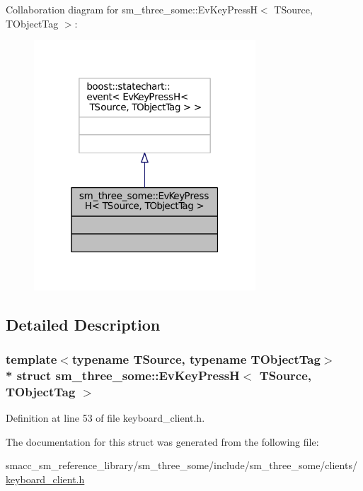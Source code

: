 Collaboration diagram for sm\+\_\+three\+\_\+some\+:\+:Ev\+Key\+PressH$<$ T\+Source, T\+Object\+Tag $>$\+:
\nopagebreak
\begin{figure}[H]
\begin{center}
\leavevmode
\includegraphics[width=235pt]{structsm__three__some_1_1EvKeyPressH__coll__graph}
\end{center}
\end{figure}


\subsection{Detailed Description}
\subsubsection*{template$<$typename T\+Source, typename T\+Object\+Tag$>$\\*
struct sm\+\_\+three\+\_\+some\+::\+Ev\+Key\+Press\+H$<$ T\+Source, T\+Object\+Tag $>$}



Definition at line 53 of file keyboard\+\_\+client.\+h.



The documentation for this struct was generated from the following file\+:\begin{DoxyCompactItemize}
\item 
smacc\+\_\+sm\+\_\+reference\+\_\+library/sm\+\_\+three\+\_\+some/include/sm\+\_\+three\+\_\+some/clients/\hyperlink{keyboard__client_8h}{keyboard\+\_\+client.\+h}\end{DoxyCompactItemize}
